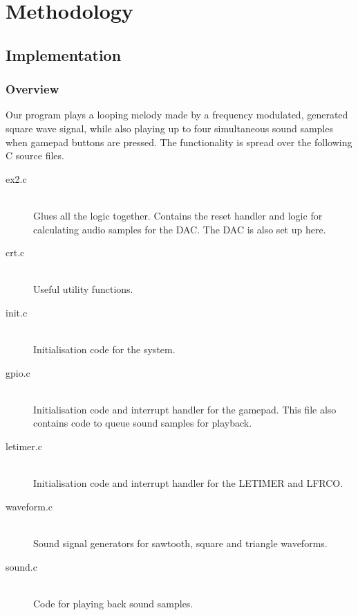 \chapter{Methodology}

\section{Implementation}

\subsection{Overview}

Our program plays a looping melody made by a frequency modulated, generated
square wave signal, while also playing up to four simultaneous sound samples
when gamepad buttons are pressed. The functionality is spread over the following
C source files.

\begin{description}
\item[ex2.c] \hfill \\
	Glues all the logic together. Contains the reset handler and logic for
	calculating audio samples for the DAC. The DAC is also set up here.
\item[crt.c] \hfill \\
	Useful utility functions.
\item[init.c] \hfill \\
	Initialisation code for the system.
\item[gpio.c] \hfill \\
	Initialisation code and interrupt handler for the gamepad. This file also
	contains code to queue sound samples for playback.
\item[letimer.c] \hfill \\
	Initialisation code and interrupt handler for the LETIMER and LFRCO.
\item[waveform.c] \hfill \\
	Sound signal generators for sawtooth, square and triangle waveforms.
\item[sound.c] \hfill \\
	Code for playing back sound samples.
\end{description}

